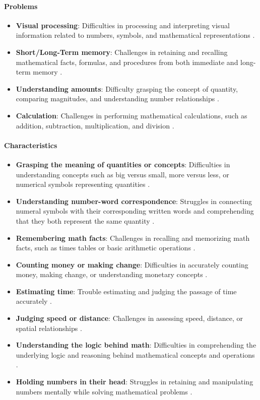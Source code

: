 \paragraph{Problems}
\begin{itemize}
    \item \textbf{Visual processing}: Difficulties in processing and interpreting visual information related to numbers, symbols, and mathematical representations \cite{understood2024}.
    \item \textbf{Short/Long-Term memory}: Challenges in retaining and recalling mathematical facts, formulas, and procedures from both immediate and long-term memory \cite{clevelandclinic2024}.
    \item \textbf{Understanding amounts}: Difficulty grasping the concept of quantity, comparing magnitudes, and understanding number relationships \cite{clevelandclinic2024}.
    \item \textbf{Calculation}: Challenges in performing mathematical calculations, such as addition, subtraction, multiplication, and division \cite{understood2024}.
\end{itemize}

\paragraph{Characteristics}
\begin{itemize}
    \item \textbf{Grasping the meaning of quantities or concepts}: Difficulties in understanding concepts such as big versus small, more versus less, or numerical symbols representing quantities \cite{clevelandclinic2024}.
    \item \textbf{Understanding number-word correspondence}: Struggles in connecting numeral symbols with their corresponding written words and comprehending that they both represent the same quantity \cite{understood2024}.
    \item \textbf{Remembering math facts}: Challenges in recalling and memorizing math facts, such as times tables or basic arithmetic operations \cite{clevelandclinic2024}.
    \item \textbf{Counting money or making change}: Difficulties in accurately counting money, making change, or understanding monetary concepts \cite{clevelandclinic2024}.
    \item \textbf{Estimating time}: Trouble estimating and judging the passage of time accurately \cite{understood2024}.
    \item \textbf{Judging speed or distance}: Challenges in assessing speed, distance, or spatial relationships \cite{pmc2024}.
    \item \textbf{Understanding the logic behind math}: Difficulties in comprehending the underlying logic and reasoning behind mathematical concepts and operations \cite{understood2024}.
    \item \textbf{Holding numbers in their head}: Struggles in retaining and manipulating numbers mentally while solving mathematical problems \cite{clevelandclinic2024}.
\end{itemize}

